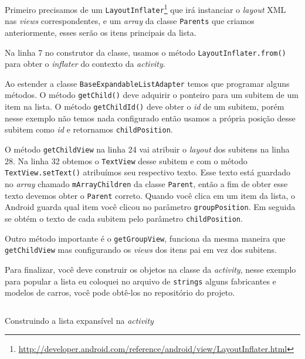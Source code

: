 \documentclass[a4paper,12pt,brazil,oneside]{book}
\begin{document}
\begin{singlespace}
Primeiro precisamos de um \texttt{LayoutInflater}\footnote{\href{http://developer.android.com/reference/android/view/LayoutInflater.html}{http://developer.android.com/reference/android/view/LayoutInflater.html}} que irá instanciar o \emph{layout} XML nas \emph{views} correspondentes, e um \emph{array} da classe \texttt{Parents} que criamos anteriormente, esses serão os itens principais da lista.

Na linha 7 no construtor da classe, usamos o método \texttt{LayoutInflater.from()} para obter o \emph{inflater} do contexto da \emph{activity}. 

Ao estender a classe \texttt{BaseExpandableListAdapter} temos que programar alguns métodos. O método \texttt{getChild()} deve adquirir o ponteiro para um subitem de um item na lista. O método \texttt{getChildId()} deve obter o \emph{id} de um subitem, porém nesse exemplo não temos nada configurado então usamos a própria posição desse subitem como \emph{id} e retornamos \texttt{childPosition}. 

O método \texttt{getChildView} na linha 24 vai atribuir o \emph{layout} dos subitens na linha 28. Na linha 32 obtemos o \texttt{TextView} desse subitem e com o método \texttt{TextView.setText()} atribuímos seu respectivo texto. Esse texto está guardado no \emph{array} chamado \texttt{mArrayChildren} da classe \texttt{Parent}, então a fim de obter esse texto devemos obter o \texttt{Parent} correto. Quando você clica em um item da lista, o Android guarda qual item você clicou no parâmetro \texttt{groupPosition}. Em seguida se obtém o texto de cada subitem pelo parâmetro \texttt{childPosition}.

Outro método importante é o \texttt{getGroupView}, funciona da mesma maneira que \texttt{getChildView} mas configurando os \emph{views} dos itens pai em vez dos subitens.

Para finalizar, você deve construir os objetos na classe da \emph{activity}, nesse exemplo para popular a lista eu coloquei no arquivo de \texttt{strings} alguns fabricantes e modelos de carros, você pode obtê-los no repositório do projeto.

\begin{listing}[H]
\inputminted[linenos=true,fontsize=\small,frame=lines, framesep=2mm, tabsize=2,numbersep=5pt]{java}{src/design/exlist-main.java}
\caption{Construindo a lista expansível na \emph{activity}}
\label{code:listaexp-ac}
\end{listing}	

\newpage


\end{singlespace}
\end{document}

